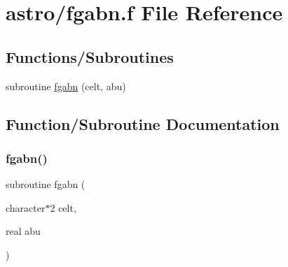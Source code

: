 \hypertarget{fgabn_8f}{}\section{astro/fgabn.f File Reference}
\label{fgabn_8f}
\subsection*{Functions/\+Subroutines}
\begin{DoxyCompactItemize}
\item 
subroutine \hyperlink{fgabn_8f_af42654d0b47e4890c0780cd6a58761e8}{fgabn} (celt, abu)
\end{DoxyCompactItemize}


\subsection{Function/\+Subroutine Documentation}
\mbox{\label{fgabn_8f_af42654d0b47e4890c0780cd6a58761e8}} 
\subsubsection{\texorpdfstring{fgabn()}{fgabn()}}
{\footnotesize\ttfamily subroutine fgabn (\begin{DoxyParamCaption}\item[{character$\ast$2}]{celt,  }\item[{real}]{abu }\end{DoxyParamCaption})}

